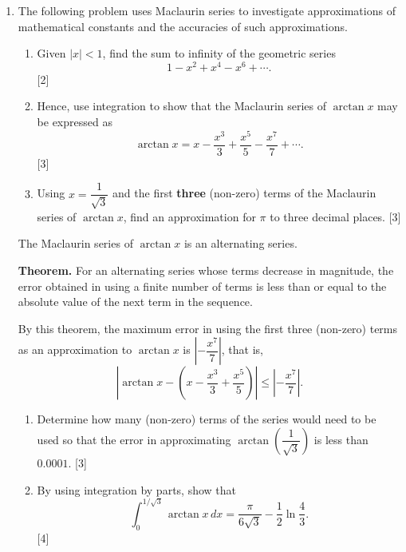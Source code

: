 \documentclass[12pt, twoside]{article}
\begin{document}
\begin{enumerate}[itemsep=0.15cm]
\newpage

\item[5.] 

The following problem uses Maclaurin series to investigate approximations
of mathematical constants and the accuracies of such approximations.

\begin{enumerate}[itemsep=0.15cm]
  \item Given $|x| < 1$, find the sum to infinity of the geometric
  series
  \[
  1 - x^{2} + x^{4} - x^{6} + \cdots.
  \]
  \hfill [2]
  \item Hence, use integration to show that the Maclaurin series of
  $\arctan x$ may be expressed as
  \[
  \arctan x = x - \frac{x^{3}}{3} + \frac{x^{5}}{5} - \frac{x^{7}}{7}
  + \cdots.
  \]
  \hfill [3]
  \item Using $x = \dfrac{1}{\sqrt{3}}$ and the first \textbf{three}
  (non-zero) terms of the Maclaurin series of $\arctan x$, find an
  approximation for $\pi$ to three decimal places. \hfill [3]
\end{enumerate}

The Maclaurin series of $\arctan x$ is an alternating series.

\textbf{Theorem.} For an alternating series whose terms decrease in
magnitude, the error obtained in using a finite number of terms is less
than or equal to the absolute value of the next term in the sequence.

By this theorem, the maximum error in using the first three (non-zero)
terms as an approximation to $\arctan x$ is $\left|-\dfrac{x^{7}}{7}\right|$,
that is,
\[
\left|\arctan x - \left(x - \frac{x^{3}}{3} + \frac{x^{5}}{5}\right)\right|
\leq \left|-\frac{x^{7}}{7}\right|.
\]

\begin{enumerate}[itemsep=0.15cm]
  \item[(d)] Determine how many (non-zero) terms of the series would
  need to be used so that the error in approximating
  $\arctan\!\left(\dfrac{1}{\sqrt{3}}\right)$ is less than $0.0001$.
  \hfill [3]
  \item[(e)] By using integration by parts, show that
  \[
  \int_{0}^{1/\sqrt{3}} \arctan x\, dx
  = \frac{\pi}{6\sqrt{3}} - \frac{1}{2}\ln\frac{4}{3}.
  \]
  \hfill [4]
\end{enumerate}

\end{enumerate}
\end{document}
